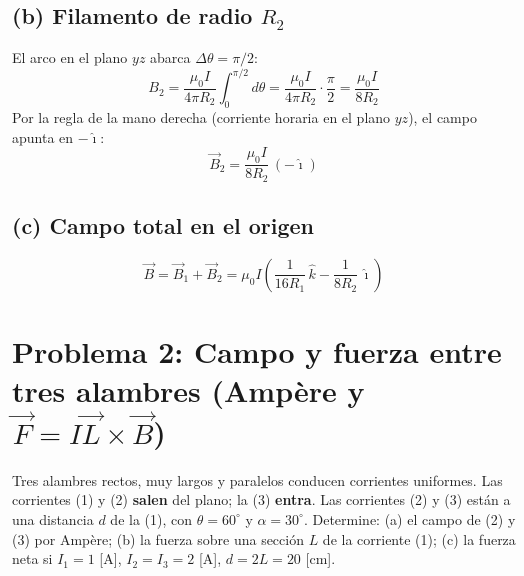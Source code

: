 \documentclass[12pt,letterpaper]{article}
\begin{document}
\subsection*{(b) Filamento de radio $R_2$}

El arco en el plano $yz$ abarca $\Delta\theta=\pi/2$:
\[
    B_2 = \frac{\mu_0 I}{4\pi R_2}\int_{0}^{\pi/2}\! d\theta
        = \frac{\mu_0 I}{4\pi R_2}\cdot\frac{\pi}{2} = \frac{\mu_0 I}{8 R_2}
\]
Por la regla de la mano derecha (corriente horaria en el plano $yz$), el campo apunta en
$-\hat{\imath}$:
\[
    \boxed{\vec{B}_2 = \frac{\mu_0 I}{8 R_2}\,(-\hat{\imath})}
\]

\subsection*{(c) Campo total en el origen}
\[
    \boxed{\vec{B} = \vec{B}_1 + \vec{B}_2
        = \mu_0 I\left(\frac{1}{16 R_1}\,\hat{k} - \frac{1}{8 R_2}\,\hat{\imath}\right)}
\]

\newpage

\section*{Problema 2: Campo y fuerza entre tres alambres (Amp\`ere y $\vec{F}=I\vec{L}\times\vec{B}$)}

\noindent Tres alambres rectos, muy largos y paralelos conducen corrientes uniformes. Las corrientes
(1) y (2) \textbf{salen} del plano; la (3) \textbf{entra}. Las corrientes (2) y (3) est\'an a una
distancia $d$ de la (1), con $\theta=60^\circ$ y $\alpha=30^\circ$. Determine: (a) el campo de (2) y
(3) por Amp\`ere; (b) la fuerza sobre una secci\'on $L$ de la corriente (1); (c) la fuerza neta si
$I_1=1$ [A], $I_2=I_3=2$ [A], $d=2L=20$ [cm].

\medskip
\end{document}
